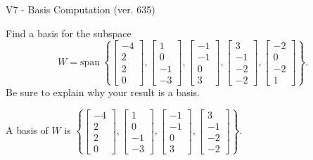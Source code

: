 \begin{exercise}
  \begin{exerciseTitle}V7 - Basis Computation (ver. 635)\end{exerciseTitle}
  \begin{exerciseStatement}
    Find a basis for the subspace 
\[W=\mathrm{span}\ \left\{\left[\begin{array}{r}
-4 \\
2 \\
2 \\
0
\end{array}\right] , \left[\begin{array}{r}
1 \\
0 \\
-1 \\
-3
\end{array}\right] , \left[\begin{array}{r}
-1 \\
-1 \\
0 \\
3
\end{array}\right] , \left[\begin{array}{r}
3 \\
-1 \\
-2 \\
-2
\end{array}\right] , \left[\begin{array}{r}
-2 \\
0 \\
-2 \\
1
\end{array}\right]\right\}.\]
 Be sure to explain why your result is a basis.


  \end{exerciseStatement}
  \begin{exerciseAnswer}
   A basis of \(W\) is  \(\left\{\left[\begin{array}{r}
-4 \\
2 \\
2 \\
0
\end{array}\right] , \left[\begin{array}{r}
1 \\
0 \\
-1 \\
-3
\end{array}\right] , \left[\begin{array}{r}
-1 \\
-1 \\
0 \\
3
\end{array}\right] , \left[\begin{array}{r}
3 \\
-1 \\
-2 \\
-2
\end{array}\right]\right\}\).
  


  \end{exerciseAnswer}
\end{exercise}